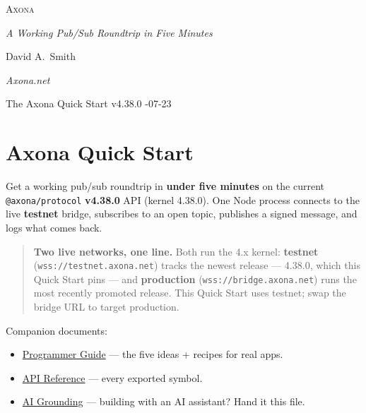 \documentclass[
  nobib]{tufte-handout}
\author{}
\date{}
\providecommand{\tightlist}{%
  \setlength{\itemsep}{0pt}\setlength{\parskip}{0pt}}
\begin{document}
\thispagestyle{empty}
\null\vfill
\begin{center}
{\fontsize{48}{52}\selectfont \textsc{Axona}\par}
\vspace{0.6em}
{\Large\itshape A Working Pub/Sub Roundtrip in Five Minutes\par}
\vspace{4em}
{\large David A.~Smith\par}
{\itshape\small Axona.net\par}
\vspace{2em}
{\small The Axona Quick Start \quad v4.38.0 -07-23\par}
\end{center}
\vfill
\null
\newpage
\pagestyle{ndhtplain}
\thispagestyle{ndhtplain}
\setcounter{page}{1}

\section{Axona Quick Start}\label{axona-quick-start}

Get a working pub/sub roundtrip in \textbf{under five minutes} on the
current \texttt{@axona/protocol} \textbf{v4.38.0} API (kernel 4.38.0).
One Node process connects to the live \textbf{testnet} bridge,
subscribes to an open topic, publishes a signed message, and logs what
comes back.

\begin{quote}
\textbf{Two live networks, one line.} Both run the 4.x kernel:
\textbf{testnet} (\texttt{wss://testnet.axona.net}) tracks the newest
release --- 4.38.0, which this Quick Start pins --- and
\textbf{production} (\texttt{wss://bridge.axona.net}) runs the most
recently promoted release. This Quick Start uses testnet; swap the
bridge URL to target production.
\end{quote}

Companion documents:

\begin{itemize}
\tightlist
\item
  \href{Axona-Programmer-Guide-v4.38.0.md}{Programmer Guide} --- the
  five ideas + recipes for real apps.
\item
  \href{Axona-API-Reference-v4.38.0.md}{API Reference} --- every
  exported symbol.
\item
  \href{Axona-AI-Grounding-v4.30.0.md}{AI Grounding} --- building with
  an AI assistant? Hand it this file.
\end{itemize}
\end{document}
